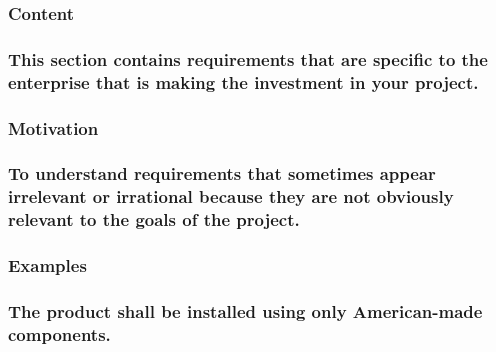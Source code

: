 \documentclass[
]{article}
\begin{document}
\hypertarget{content-17}{%
\subsubsection{Content}\label{content-17}}

\hypertarget{this-section-contains-requirements-that-are-specific-to-the-enterprise-that-is-making-the-investment-in-your-project.}{%
\subsubsection{\texorpdfstring{This section contains requirements that
are specific to the enterprise that is making the investment in your
project.
}{This section contains requirements that are specific to the enterprise that is making the investment in your project. }}\label{this-section-contains-requirements-that-are-specific-to-the-enterprise-that-is-making-the-investment-in-your-project.}}

\hypertarget{motivation-17}{%
\subsubsection{Motivation}\label{motivation-17}}

\hypertarget{to-understand-requirements-that-sometimes-appear-irrelevant-or-irrational-because-they-are-not-obviously-relevant-to-the-goals-of-the-project.}{%
\subsubsection{\texorpdfstring{To understand requirements that sometimes
appear irrelevant or irrational because they are not obviously relevant
to the goals of the project.
}{To understand requirements that sometimes appear irrelevant or irrational because they are not obviously relevant to the goals of the project. }}\label{to-understand-requirements-that-sometimes-appear-irrelevant-or-irrational-because-they-are-not-obviously-relevant-to-the-goals-of-the-project.}}

\hypertarget{examples-7}{%
\subsubsection{Examples}\label{examples-7}}

\hypertarget{the-product-shall-be-installed-using-only-american-made-components.}{%
\subsubsection{The product shall be installed using only American-made
components.}\label{the-product-shall-be-installed-using-only-american-made-components.}}
\end{document}
